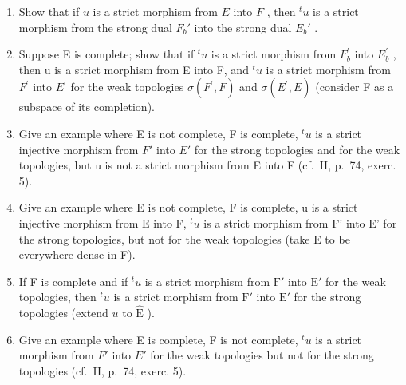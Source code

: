 \begin{enumerate}
\def\labelenumi{\alph{enumi})}
\item
  Show that if \(u\) is a strict morphism from \(E\) into \(F\) , then \({}^t u\) is a strict morphism from the strong dual \(F_b'\) into the strong dual \(E_b'\) .
\item
  Suppose E is complete; show that if \(^{t}u\) is a strict morphism from \(F_{b}^{\prime}\) into \(E_{b}^{\prime}\) , then u is a strict morphism from E into F, and \(^{t}u\) is a strict morphism from \(F^{\prime}\) into \(E^{\prime}\) for the weak topologies \(\sigma(F^{\prime}, F)\) and \(\sigma(E^{\prime}, E)\) (consider F as a subspace of its completion).
\item
  Give an example where E is not complete, F is complete, \(^{t}u\) is a strict injective morphism from \(F'\) into \(E'\) for the strong topologies and for the weak topologies, but u is not a strict morphism from E into F (cf.~II, p.~74, exerc. 5).
\item
  Give an example where E is not complete, F is complete, u is a strict injective morphism from E into F, \(^{t}u\) is a strict morphism from F' into E' for the strong topologies, but not for the weak topologies (take E to be everywhere dense in F).
\item
  If F is complete and if \({}^t u\) is a strict morphism from \(\mathrm{F}'\) into \(\mathrm{E}'\) for the weak topologies, then \({}^t u\) is a strict morphism from \(\mathrm{F}'\) into \(\mathrm{E}'\) for the strong topologies (extend \(u\) to \(\hat{\mathrm{E}}\) ).
\item
  Give an example where E is complete, F is not complete, \(^{t}u\) is a strict morphism from \(F'\) into \(E'\) for the weak topologies but not for the strong topologies (cf.~II, p.~74, exerc. 5).
\end{enumerate}

